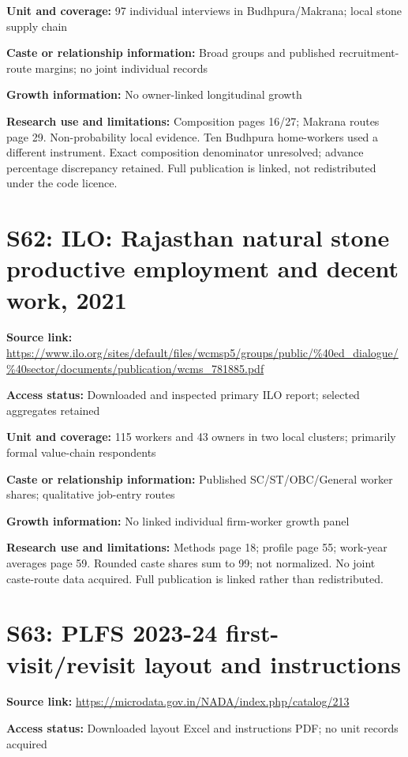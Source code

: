 \documentclass[11pt,a4paper]{report}
\begin{document}
\textbf{Unit and coverage:} 97 individual interviews in Budhpura/\allowbreak{}Makrana; local stone supply chain

\textbf{Caste or relationship information:} Broad groups and published recruitment-route margins; no joint individual records

\textbf{Growth information:} No owner-linked longitudinal growth

\textbf{Research use and limitations:} Composition pages 16/\allowbreak{}27; Makrana routes page 29. Non-probability local evidence. Ten Budhpura home-workers used a different instrument. Exact composition denominator unresolved; advance percentage discrepancy retained. Full publication is linked, not redistributed under the code licence.

\section{S62: ILO: Rajasthan natural stone productive employment and decent work, 2021}\hypertarget{S62}{}
\textbf{Source link:} \url{https://www.ilo.org/sites/default/files/wcmsp5/groups/public/%40ed_dialogue/%40sector/documents/publication/wcms_781885.pdf}

\textbf{Access status:} Downloaded and inspected primary ILO report; selected aggregates retained

\textbf{Unit and coverage:} 115 workers and 43 owners in two local clusters; primarily formal value-chain respondents

\textbf{Caste or relationship information:} Published SC/\allowbreak{}ST/\allowbreak{}OBC/\allowbreak{}General worker shares; qualitative job-entry routes

\textbf{Growth information:} No linked individual firm-worker growth panel

\textbf{Research use and limitations:} Methods page 18; profile page 55; work-year averages page 59. Rounded caste shares sum to 99; not normalized. No joint caste-route data acquired. Full publication is linked rather than redistributed.

\section{S63: PLFS 2023-24 first-visit/\allowbreak{}revisit layout and instructions}\hypertarget{S63}{}
\textbf{Source link:} \url{https://microdata.gov.in/NADA/index.php/catalog/213}

\textbf{Access status:} Downloaded layout Excel and instructions PDF; no unit records acquired
\end{document}

